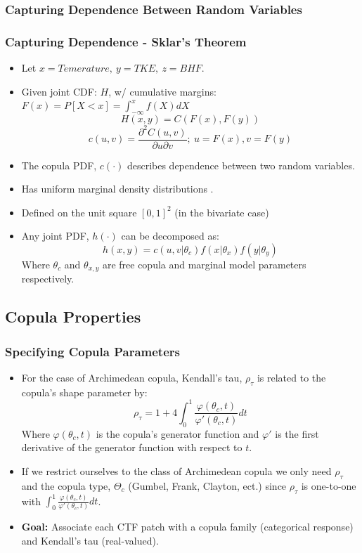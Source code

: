 \documentclass[t, pdftex]{beamer}
\begin{document}
\subsubsection*{Capturing Dependence Between Random Variables}
\begin{frame}
\frametitle{Capturing Dependence - Sklar's Theorem}
\vspace{-16.5pt}
\begin{itemize}
\item Let $x=Temerature,\ y=TKE,\ z=BHF$.
\item Given joint CDF: $H$, w/ cumulative margins: $F(x)=P[X < x] = \int_{-\infty}^{x}f(X)dX$
\[
H(x,y) = C(F(x), F(y))
\]
\[
c(u, v) = \frac{\partial^2 C(u, v)}{\partial u \partial v};\ u=F(x), v=F(y)
\]
\item  The copula PDF, $c(\cdot)$ describes dependence between two random variables.
\item  Has uniform marginal density distributions \cite{Nelsen2006}.
\item  Defined on the unit square $[0, 1]^2$ (in the bivariate case)
\item  Any joint PDF, $h(\cdot)$ can be decomposed as: \\
\[
h(x, y) = c(u, v |\theta_c)f(x|\theta_x)f(y|\theta_y)
\]
Where $\theta_c$ and $\theta_{x,y}$ are free copula and marginal model parameters respectively.
\end{itemize}
\end{frame}

\subsection*{Copula Properties}
\begin{frame}[noframenumbering]
\frametitle{Specifying Copula Parameters}
\begin{itemize}
    \item For the case of Archimedean copula, Kendall's tau, $\rho_\tau$ is
    related to the copula's shape parameter by:
    \[
    \rho_\tau = 1 + 4 \int_0^1 \frac{\varphi(\theta_c,t)}{\varphi'(\theta_c, t)}dt
    \]
    Where $\varphi(\theta_c, t)$ is the copula's generator function and $\varphi'$ is the first derivative of the generator function with respect to $t$.
    \item  If we restrict ourselves to the class of  Archimedean copula we only need $\rho_\tau$ and the copula type, $\Theta_c$ (Gumbel, Frank, Clayton, ect.) since $\rho_\tau$ is one-to-one with $\int_0^1 \frac{\varphi(\theta_c,t)}{\varphi'(\theta_c, t)}dt$.
    \item \textbf{Goal:} Associate each CTF patch with a copula family (categorical response) and Kendall's tau (real-valued).
\end{itemize}
\end{frame}
\end{document}
